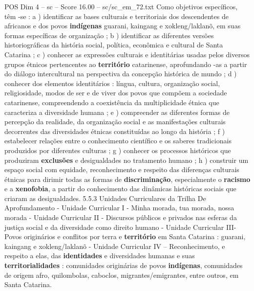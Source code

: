 \begin{textsample}{POS Dim 4 – sc – Score 16.00 – sc/sc\_em\_72.txt}
Como objetivos específicos, têm -se : a ) identificar as bases culturais e territoriais dos descendentes de africanos e dos povos \textbf{indígenas} guarani, kaingang e xokleng/laklanõ, em suas formas específicas de organização ; b ) identificar as diferentes versões historiográficas da história social, política, econômica e cultural de Santa Catarina ; c ) conhecer as expressões culturais e identitárias usadas pelos diversos grupos étnicos pertencentes ao \textbf{território} catarinense, aprofundando -as a partir do diálogo intercultural na perspectiva da concepção histórica de mundo ; d ) conhecer dos elementos identitários : língua, cultura, organização social, religiosidade, modos de ser e de viver dos povos que compõem a sociedade catarinense, compreendendo a coexistência da multiplicidade étnica que caracteriza a diversidade humana ; e ) compreender as diferentes formas de percepção da realidade, da organização social e as manifestações culturais decorrentes das diversidades étnicas constituídas ao longo da história ; f ) estabelecer relações entre o conhecimento científico e os saberes tradicionais produzidos por diferentes culturas ; g ) conhecer os processos históricos que produziram \textbf{exclusões} e desigualdades no tratamento humano ; h ) construir um espaço social com equidade, reconhecimento e respeito das diferenças culturais étnicas para dirimir todas as formas de \textbf{discriminação}, especialmente o \textbf{racismo} e a \textbf{xenofobia}, a partir do conhecimento das dinâmicas históricas sociais que criaram as desigualdades. 5.5.3 Unidades Curriculares da Trilha De Aprofundamento - Unidade Curricular I - Minha morada, tua morada, nossa morada - Unidade Curricular II - Discursos públicos e privados nas esferas da justiça social e da diversidade como direito humano - Unidade Curricular III- Povos originários e conflitos por terra e \textbf{território} em Santa Catarina : guarani, kaingang e xokleng/laklanõ - Unidade Curricular IV – Reconhecimento, e respeito a elas, das \textbf{identidades} e diversidades humanas e suas \textbf{territorialidades} : comunidades originárias de povos \textbf{indígenas}, comunidades de origem afro, quilombolas, caboclos, migrantes/emigrantes, entre outros, em Santa Catarina.

\end{textsample}
